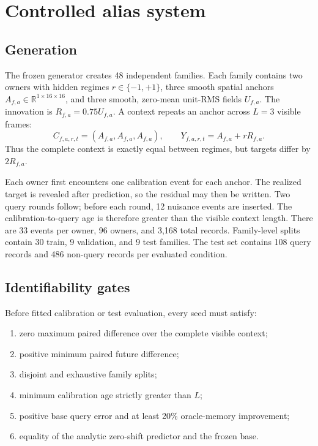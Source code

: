 \documentclass[11pt]{article}
\newcommand{\R}{\mathbb{R}}
\begin{document}
\section{Controlled alias system}

\subsection{Generation}

The frozen generator creates 48 independent families. Each family contains two
owners with hidden regimes $r\in\{-1,+1\}$, three smooth spatial anchors
$A_{f,a}\in\R^{1\times16\times16}$, and three smooth, zero-mean unit-RMS fields
$U_{f,a}$. The innovation is $R_{f,a}=0.75U_{f,a}$. A context repeats an anchor
across $L=3$ visible frames:
\begin{equation}
 C_{f,a,r,t}=(A_{f,a},A_{f,a},A_{f,a}), \qquad
 Y_{f,a,r,t}=A_{f,a}+rR_{f,a}.
\end{equation}
Thus the complete context is exactly equal between regimes, but targets differ
by $2R_{f,a}$.

Each owner first encounters one calibration event for each anchor. The realized
target is revealed after prediction, so the residual may then be written. Two
query rounds follow; before each round, 12 nuisance events are inserted. The
calibration-to-query age is therefore greater than the visible context length.
There are 33 events per owner, 96 owners, and 3,168 total records. Family-level
splits contain 30 train, 9 validation, and 9 test families. The test set contains
108 query records and 486 non-query records per evaluated condition.

\subsection{Identifiability gates}

Before fitted calibration or test evaluation, every seed must satisfy:

\begin{enumerate}[leftmargin=*]
  \item zero maximum paired difference over the complete visible context;
  \item positive minimum paired future difference;
  \item disjoint and exhaustive family splits;
  \item minimum calibration age strictly greater than $L$;
  \item positive base query error and at least 20\% oracle-memory improvement;
  \item equality of the analytic zero-shift predictor and the frozen base.
\end{enumerate}
\end{document}
